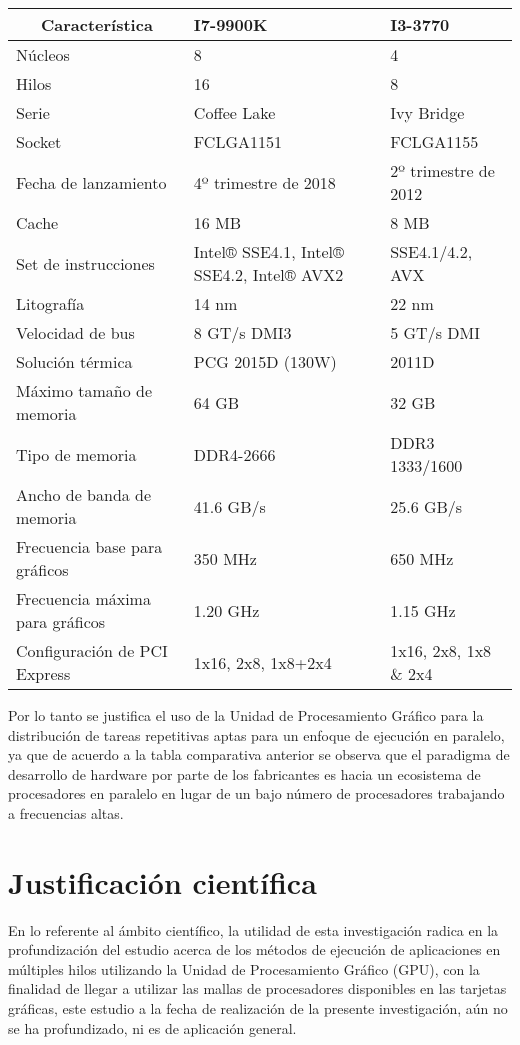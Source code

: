 \documentclass[../main.tex]{subfiles}
\begin{document}
  \begin{table}[]
    \begin{tabular}{|p{5.6cm}|p{4cm}|p{4cm}|}
      \hline
      \multicolumn{1}{|c|}{\textbf{Característica}} & \textbf{I7-9900K} & \textbf{I3-3770} \\ \hline
      Núcleos & 8 & 4 \\ \hline
      Hilos & 16 & 8 \\ \hline
      Serie & Coffee Lake & Ivy Bridge \\ \hline
      Socket & FCLGA1151 & FCLGA1155 \\ \hline
      Fecha de lanzamiento & 4º trimestre de 2018 & 2º trimestre de 2012 \\ \hline
      Cache & 16 MB & 8 MB \\ \hline
      Set de instrucciones & Intel® SSE4.1, Intel® SSE4.2, Intel® AVX2 & SSE4.1/4.2, AVX \\ \hline
      Litografía & 14 nm & 22 nm \\ \hline
      Velocidad de bus & 8 GT/s DMI3 & 5 GT/s DMI \\ \hline
      Solución térmica & PCG 2015D (130W) & 2011D \\ \hline
      Máximo tamaño de memoria & 64 GB & 32 GB \\ \hline
      Tipo de memoria & DDR4-2666 & DDR3 1333/1600 \\ \hline
      Ancho de banda de memoria & 41.6 GB/s & 25.6 GB/s \\ \hline
      Frecuencia base para gráficos & 350 MHz & 650 MHz \\ \hline
      Frecuencia máxima para gráficos & 1.20 GHz & 1.15 GHz \\ \hline
      Configuración de PCI Express & 1x16, 2x8, 1x8+2x4 & 1x16, 2x8, 1x8 \& 2x4 \\ \hline
    \end{tabular}
  \end{table}

  Por lo tanto se justifica el uso de la Unidad de Procesamiento Gráfico para la distribución de tareas repetitivas aptas para un enfoque de ejecución en paralelo, ya que de acuerdo a la tabla comparativa anterior se observa que el paradigma de desarrollo de hardware por parte de los fabricantes es hacia un ecosistema de procesadores en paralelo en lugar de un bajo número de procesadores trabajando a frecuencias altas.

  \section{Justificación científica}

  En lo referente al ámbito científico, la utilidad de esta investigación radica en la profundización del estudio acerca de los métodos de ejecución de aplicaciones en múltiples hilos utilizando la Unidad de Procesamiento Gráfico (GPU), con la finalidad de llegar a utilizar las mallas de procesadores disponibles en las tarjetas gráficas, este estudio a la fecha de realización de la presente investigación, aún no se ha profundizado, ni es de aplicación general.

  \bibliografia
\end{document}
